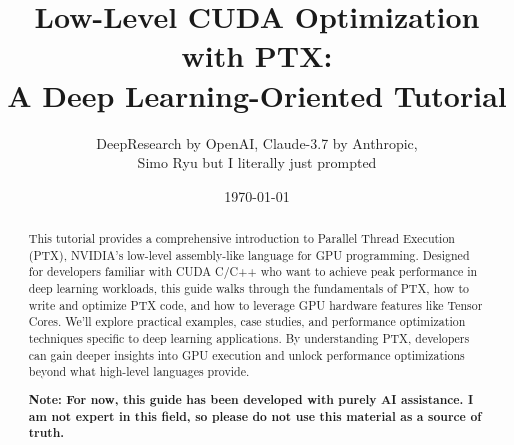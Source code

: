 \documentclass[11pt,a4paper]{article}
\title{\LARGE \textbf{Low-Level CUDA Optimization with PTX:\\A Deep Learning-Oriented Tutorial}}
\author{DeepResearch by OpenAI, Claude-3.7 by Anthropic,\\ Simo Ryu but I literally just prompted}
\date{\today}
\begin{document}
\maketitle
\thispagestyle{empty}

\begin{abstract}
This tutorial provides a comprehensive introduction to Parallel Thread Execution (PTX), NVIDIA's low-level assembly-like language for GPU programming.
Designed for developers familiar with CUDA C/C++ who want to achieve peak performance in deep learning workloads, this guide walks through the fundamentals of PTX, how to write and optimize PTX code, and how to leverage GPU hardware features like Tensor Cores.
We'll explore practical examples, case studies, and performance optimization techniques specific to deep learning applications.
By understanding PTX, developers can gain deeper insights into GPU execution and unlock performance optimizations beyond what high-level languages provide.

\textbf{Note: For now, this guide has been developed with purely AI assistance. I am not expert in this field, so please do not use this material as a source of truth.}

\end{abstract}

\vspace{1cm}
\renewcommand{\contentsname}{\color{blue!70!black}Table of Contents}
\tableofcontents
\thispagestyle{empty}
\newpage
\end{document}

